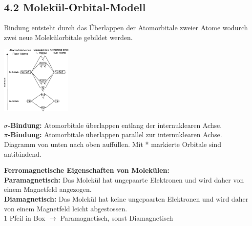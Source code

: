 \begin{multicols*}{4}
{}


\subsection{4.2 Molekül-Orbital-Modell}{
    Bindung entsteht durch das Überlappen der Atomorbitale zweier
    Atome wodurch zwei neue Molekülorbitale gebildet werden.\\
    \begin{minipage}{35mm}
       	\includegraphics[width=3.5cm]{Bilder/Molekuelorbitalmodell.png}
    \end{minipage}
    \begin{minipage}{32mm}
        \textbf{$\sigma$-Bindung:} Atomorbitale überlappen entlang der internuklearen Achse.\\
        \textbf{$\pi$-Bindung:} Atomorbitale überlappen parallel zur internuklearen Achse.\\
        Diagramm von unten nach oben auffüllen. Mit * markierte Orbitale sind antibindend.
    \end{minipage}
    \textbf{Ferromagnetische Eigenschaften von Molekülen:}\\
    \textbf{Paramagnetisch: }Das Molekül hat ungepaarte Elektronen und wird daher
    von einem Magnetfeld angezogen.\\
    \textbf{Diamagnetisch: }Das Molekül hat keine ungepaarten Elektronen und wird
    daher von einem Magnetfeld leicht abgestossen.\\
    1 Pfeil in Box $\rightarrow$ Paramagnetisch, sonst Diamagnetisch
}


\end{multicols*}

